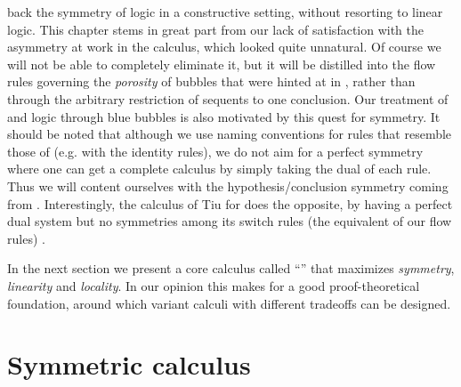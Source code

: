\begin{description}
    back the symmetry of  logic in a constructive setting, without
    resorting to linear logic. This chapter stems in great part from our lack of
    satisfaction with the asymmetry at work in the  calculus, which
    looked quite unnatural. Of course we will not be able to completely
    eliminate it, but it will be distilled into the flow rules governing the
    \emph{porosity} of bubbles that were hinted at in , rather
    than through the arbitrary restriction of sequents to one
    conclusion. Our treatment of
     and  logic through blue bubbles is
    also motivated by this quest for symmetry. It should be noted that although
    we use naming conventions for rules that resemble those of  (e.g.
    with the identity rules), we do not aim for a perfect symmetry where one can
    get a complete calculus by simply taking the dual of each rule.
    Thus we will content ourselves with the hypothesis/conclusion symmetry
    coming from . Interestingly, the calculus  of Tiu
    for   does the opposite, by having a perfect
    dual system  but no symmetries among its switch rules (the
    equivalent of our flow rules) \cite{tiu_local_2006}.
\end{description}

In the next section we present a core calculus called ``'' that
maximizes \emph{symmetry}, \emph{linearity} and \emph{locality}. In our opinion
this makes for a good proof-theoretical foundation, around which variant calculi
with different tradeoffs can be designed.


\section{Symmetric calculus}

